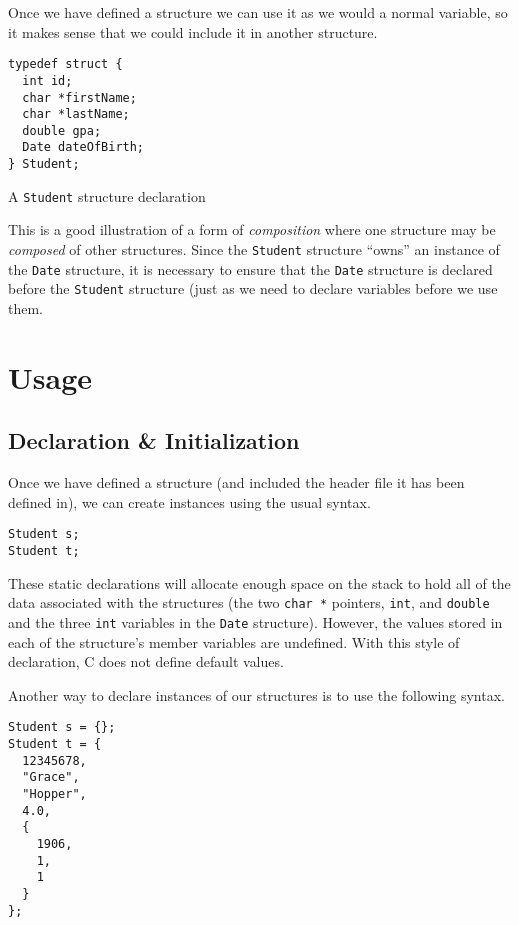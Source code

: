 Once we have defined a structure we can use it as we would a normal
variable, so it makes sense that we could include it in another structure.

\begin{listing}
\centering
\begin{verbatim}
typedef struct {
  int id;
  char *firstName;
  char *lastName;
  double gpa;
  Date dateOfBirth;
} Student;
\end{verbatim}
\caption{A \texttt{Student} structure declaration}
\label{code:c:studentStructure}
\end{listing}

This is a good illustration of a form of  
\emph{composition} where 
one structure may be \emph{composed} of other structures.  Since
the \texttt{Student} structure ``owns'' an instance of the
\texttt{Date} structure, it is necessary to ensure that 
the \texttt{Date} structure is declared before the 
\texttt{Student} structure (just as we need to declare 
variables before we use them.

\section{Usage}

\subsection{Declaration \& Initialization}

Once we have defined a structure (and included the header file
it has been defined in), we can create instances using the usual
syntax.

\begin{verbatim}
Student s;
Student t;
\end{verbatim}

These static declarations will allocate enough space on the stack
to hold all of the data associated with the structures (the two
\texttt{char *} pointers, \texttt{int}, and 
\texttt{double} and the three \texttt{int} variables
in the \texttt{Date} structure).  However, the values stored in 
each of the structure's member variables are undefined.  With
this style of declaration, C does not define default values.

Another way to declare instances of our structures
is to use the following syntax.

\begin{verbatim}
Student s = {};
Student t = {
  12345678,
  "Grace",
  "Hopper",
  4.0,
  {
    1906,
    1,
    1
  }
};
\end{verbatim}

